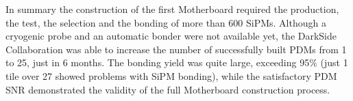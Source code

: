In summary the construction of the first Motherboard required the production, the test, the selection and the bonding of more than 600 SiPMs. Although a cryogenic probe and an automatic bonder were not available yet, the DarkSide Collaboration was able to increase the number of successfully built PDMs from 1 to 25, just in 6 months. The bonding yield was quite large, exceeding 95$\%$ (just 1 tile over 27 showed problems with SiPM bonding), while the satisfactory PDM SNR demonstrated the validity of the full Motherboard construction process.


%
